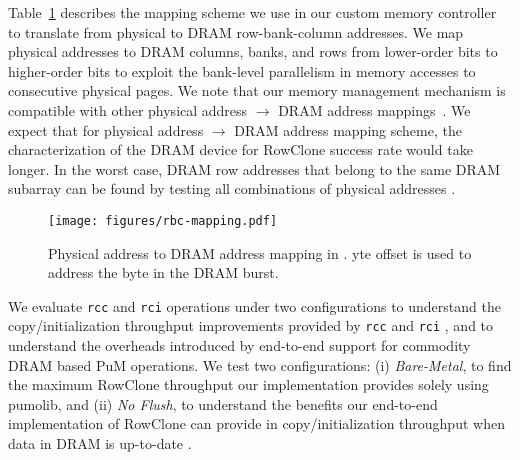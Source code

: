 
Table~\ref{fig:DDR-address-mapping} describes the mapping scheme we use in our custom memory controller to translate from physical to DRAM row-bank-column addresses. We map physical addresses to DRAM columns, banks, and rows from lower-order bits to higher-order bits to exploit the bank-level parallelism in memory accesses to consecutive physical pages. We note that our memory management mechanism is compatible with other physical address $\rightarrow{}$ DRAM address mappings~\cite{hillenbrand2017Physical}.  We expect that for  physical address $\rightarrow{}$ DRAM address mapping scheme, the characterization of the DRAM device for RowClone success rate would take longer. In the worst case, DRAM row addresses that belong to the same DRAM subarray can be found by testing all combinations of physical addresses . 

\begin{figure}[!ht]
  \centering
  \texttt{[image: figures/rbc-mapping.pdf]}
  \caption{Physical address to DRAM address mapping in \X. yte offset is used to address the byte in the DRAM burst.}
  \label{fig:DDR-address-mapping}
\end{figure}
We evaluate \texttt{rcc} and \texttt{rci} operations under two configurations to understand the copy/initialization throughput improvements provided by \texttt{rcc} and \texttt{rci} , and to understand the overheads introduced by end-to-end support for {commodity DRAM based} PuM operations. We test two configurations: (i) \emph{Bare-Metal}, to find the maximum RowClone throughput our implementation provides solely using pumolib, 
and (ii) \emph{No Flush}, to understand the benefits our end-to-end implementation  of RowClone can provide in copy/initialization throughput when data in DRAM is up-to-date .

